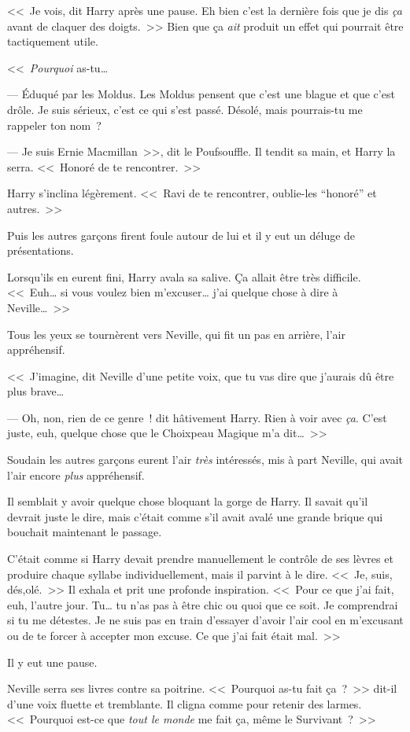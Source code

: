 <<~Je vois, dit Harry après une pause. Eh bien c'est la dernière fois que je dis \emph{ça} avant de claquer des doigts.~>> Bien que ça \emph{ait} produit un effet qui pourrait être tactiquement utile.

<<~\emph{Pourquoi} as-tu…

--- Éduqué par les Moldus. Les Moldus pensent que c'est une blague et que c'est drôle. Je suis sérieux, c'est ce qui s'est passé. Désolé, mais pourrais-tu me rappeler ton nom~?

--- Je suis Ernie Macmillan~>>, dit le Poufsouffle. Il tendit sa main, et Harry la serra. <<~Honoré de te rencontrer.~>>

Harry s'inclina légèrement. <<~Ravi de te rencontrer, oublie-les “honoré” et autres.~>>

Puis les autres garçons firent foule autour de lui et il y eut un déluge de présentations.

Lorsqu'ils en eurent fini, Harry avala sa salive. Ça allait être très difficile. <<~Euh… si vous voulez bien m'excuser… j'ai quelque chose à dire à Neville…~>>

Tous les yeux se tournèrent vers Neville, qui fit un pas en arrière, l'air appréhensif.

<<~J'imagine, dit Neville d'une petite voix, que tu vas dire que j'aurais dû être plus brave…

--- Oh, non, rien de ce genre~! dit hâtivement Harry. Rien à voir avec \emph{ça}. C'est juste, euh, quelque chose que le Choixpeau Magique m'a dit…~>>

Soudain les autres garçons eurent l'air \emph{très} intéressés, mis à part Neville, qui avait l'air encore \emph{plus} appréhensif.

Il semblait y avoir quelque chose bloquant la gorge de Harry. Il savait qu'il devrait juste le dire, mais c'était comme s'il avait avalé une grande brique qui bouchait maintenant le passage.

C'était comme si Harry devait prendre manuellement le contrôle de ses lèvres et produire chaque syllabe individuellement, mais il parvint à le dire. <<~Je, suis, dés,olé.~>> Il exhala et prit une profonde inspiration. <<~Pour ce que j'ai fait, euh, l'autre jour. Tu… tu n'as pas à être chic ou quoi que ce soit. Je comprendrai si tu me détestes. Je ne suis pas en train d'essayer d'avoir l'air cool en m'excusant ou de te forcer à accepter mon excuse. Ce que j'ai fait était mal.~>>

Il y eut une pause.

Neville serra ses livres contre sa poitrine. <<~Pourquoi as-tu fait ça~?~>> dit-il d'une voix fluette et tremblante. Il cligna comme pour retenir des larmes. <<~Pourquoi est-ce que \emph{tout le monde} me fait ça, même le Survivant~?~>>

